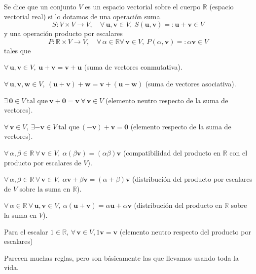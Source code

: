Se dice que un conjunto \(V\) es un espacio vectorial sobre el cuerpo \(\mathbb{R}\) (espacio vectorial real) si lo dotamos de una operación suma
\begin{equation*}
    S:V\times V \rightarrow V,\quad \forall\, \mathbf{u},\mathbf{v}\in V,\ S(\mathbf{u},\mathbf{v}) =: \mathbf{u}+\mathbf{v}\in V
\end{equation*}
y una operación producto por escalares
\begin{equation*}
    P:\mathbb{R}\times V \rightarrow V,\quad \forall\, \alpha\in\mathbb{R}\forall\, \mathbf{v}\in V,\ P(\alpha,\mathbf{v}) =: \alpha\mathbf{v}\in V
\end{equation*}
tales que 
\begin{myitemize}
    \item \(\forall\, \mathbf{u},\mathbf{v}\in V,\ \mathbf{u}+\mathbf{v} = \mathbf{v}+ \mathbf{u}\) (suma de vectores conmutativa).
    \item \(\forall\, \mathbf{u},\mathbf{v},\mathbf{w}\in V,\ (\mathbf{u}+\mathbf{v}) + \mathbf{w} = \mathbf{v} + (\mathbf{u} + \mathbf{w})\) (suma de vectores asociativa).
    \item \(\exists\, \mathbf{0}\in V\ \text{tal que}\ \mathbf{v} + \mathbf{0} = \mathbf{v}\ \forall\, \mathbf{v}\in V\) (elemento neutro respecto de la suma de vectores).
    \item \(\forall\, \mathbf{v}\in V,\ \exists -\mathbf{v}\in V\ \text{tal que}\ (-\mathbf{v}) + \mathbf{v} = \mathbf{0}\) (elemento respecto de la suma de vectores).
    \item \(\forall\, \alpha,\beta\in \mathbb{R}\ \forall\, \mathbf{v}\in V, \ \alpha(\beta\mathbf{v}) = (\alpha\beta)\mathbf{v}\) (compatibilidad del producto en \(\mathbb{R}\) con el producto por escalares de \(V\)).
    \item \(\forall\, \alpha,\beta\in \mathbb{R}\ \forall\, \mathbf{v}\in V,\ \alpha\mathbf{v} + \beta\mathbf{v} = (\alpha+\beta)\mathbf{v}\) (distribución del producto por escalares de \(V\) sobre la suma en \(\mathbb{R}\)).
    \item \(\forall\, \alpha\in \mathbb{R}\ \forall\, \mathbf{u},\mathbf{v}\in V,\ \alpha(\mathbf{u}+\mathbf{v}) =  \alpha\mathbf{u} + \alpha\mathbf{v}\) (distribución del producto en \(\mathbb{R}\) sobre la suma en \(V\)).
    \item Para el escalar \(1\in\mathbb{R}\), \(\forall\,\mathbf{v}\in V, 1\mathbf{v} = \mathbf{v}\) (elemento neutro respecto del producto por escalares)
\end{myitemize}
Parecen muchas reglas, pero son básicamente las que llevamos usando toda la vida.

